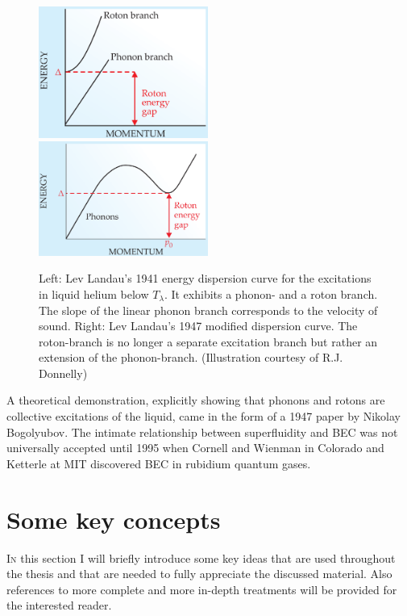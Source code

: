 		\begin{figure}[t]
			\begin{center}
				\includegraphics[width=0.495\textwidth]{phonon-roton-landau-first}
				\includegraphics[width=0.495\textwidth]{phonon-roton-bogoliubov}
			\end{center}
			\caption{Left: Lev Landau's 1941 energy dispersion curve\citep{Landau1941} for the excitations in liquid helium below $T_\lambda$. It exhibits a phonon- and a roton branch. The slope of the linear phonon branch corresponds to the velocity of sound. Right: Lev Landau's 1947 modified dispersion curve. The roton-branch is no longer a separate excitation branch but rather an extension of the phonon-branch. (Illustration courtesy of R.J. Donnelly\citep{Donnelly2009})}
			\label{fig:phonon-roton}
		\end{figure}

		A theoretical demonstration, explicitly showing that phonons and rotons are collective excitations of the liquid, came in the form of a 1947 paper by Nikolay Bogolyubov\citep{Bogolyubov1947}. The intimate relationship between superfluidity and BEC was not universally accepted until 1995 when Cornell and Wienman in Colorado and Ketterle at MIT discovered BEC in rubidium quantum gases\citep{Cornell2002,Ketterle2002}.

	\section{Some key concepts}
		\lettrine[lines=3,findent=3pt,nindent=0pt]{I}{n} this section I will briefly introduce some key ideas that are used throughout the thesis and that are needed to fully appreciate the discussed material. Also references to more complete and more in-depth treatments will be provided for the interested reader.
		
